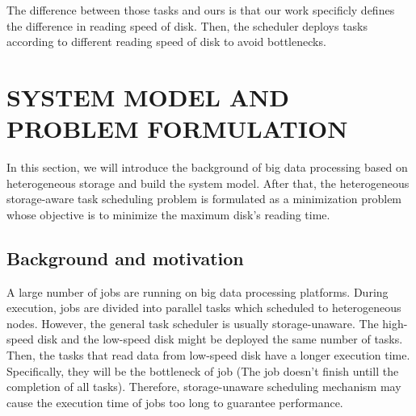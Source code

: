 \documentclass[conference]{IEEEtran}
\begin{document}
The difference between those tasks and ours is that our work specificly defines the difference in reading speed of disk. Then, the scheduler deploys tasks according to different reading speed of disk to avoid bottlenecks.

\section{SYSTEM MODEL AND PROBLEM FORMULATION}\label{SYSTEM_MODEL}
In this section, we will introduce the background of big data processing based on heterogeneous storage and build the system model. After that, the heterogeneous storage-aware task scheduling problem is formulated as a minimization problem whose objective is to minimize the maximum disk's reading time.

\subsection{Background and motivation}\label{AA}

A large number of jobs are running on big data processing platforms. During execution, jobs are divided into parallel tasks which scheduled to heterogeneous nodes. However, the general task scheduler is usually storage-unaware. The high-speed disk and the low-speed disk might be deployed the same number of tasks. Then, the tasks that read data from low-speed disk have a longer execution time. Specifically, they will be the bottleneck of job (The job doesn't finish untill the completion of all tasks). Therefore, storage-unaware scheduling mechanism may cause the execution time of jobs too long to guarantee performance.

\end{document}
